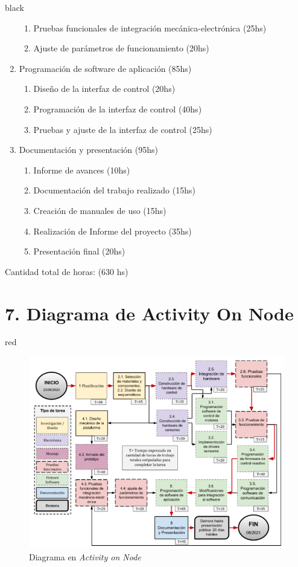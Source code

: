 \documentclass[11pt]{charter}
\begin{document}
\begin{consigna}{black}
\begin{enumerate}
\begin{enumerate}
	\item Pruebas funcionales de integración mecánica-electrónica (25hs)
	\item Ajuste de parámetros de funcionamiento (20hs)
	\end{enumerate}
	\item Programación de software de aplicación (85hs) 
	\begin{enumerate}
	\item Diseño de la interfaz de control (20hs) 
	\item Programación de la interfaz de control (40hs)
	\item  Pruebas y ajuste de la interfaz de control (25hs)
	\end{enumerate}
	\item Documentación y presentación (95hs) 
	\begin{enumerate}
	\item Informe de avances (10hs)
	\item Documentación del trabajo realizado (15hs) 
	\item Creación de manuales de uso (15hs) 
	\item Realización de Informe del proyecto (35hs) 
	\item Presentación final (20hs)
	\end{enumerate}
\end{enumerate}

Cantidad total de horas: (630 hs)

\end{consigna}
\pagebreak

\section{7. Diagrama de Activity On Node}
\label{sec:AoN}

\begin{consigna}{red}

\begin{figure}[htpb]
\centering 
\includegraphics[width=.8\textwidth]{./Figuras/AoN.png}
\caption{Diagrama en \textit{Activity on Node}}
\label{fig:AoN}
\end{figure}

\end{consigna}
\pagebreak
\end{document}
